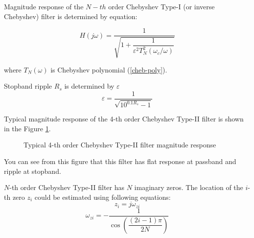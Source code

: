 Magnitude response of the $N-th$ order Chebyshev Type-I (or inverse Chebyshev)
filter is determined by equation:

\begin{equation}
 H(j\omega) = \frac{1}{\sqrt{1+\dfrac{1}{\varepsilon^2
T^2_N(\omega_c/\omega)}}}
\end{equation}

where $T_N(\omega)$ is Chebyshev polynomial (\ref{cheb-poly}).

Stopband ripple $R_s$ is determined by $\varepsilon$
\begin{equation}
 \varepsilon = \frac{1}{\sqrt{10^{0.1R_s}-1}}
\end{equation}

Typical magnitude response of the 4-th order Chebyshev Type-II filter is shown
in the Figure \ref{fig:cheb2}.

\begin{figure}[!ht]
  \centering
  \caption{Typical 4-th order Chebyshev Type-II filter magnitude response}
  \label{fig:cheb2}
\end{figure}

You can see from this figure that this filter has flat response at passband and
ripple at stopband.

$N$-th order Chebyshev Type-II filter has $N$ imaginary zeros. The location of
the $i$-th zero $z_i$ could be estimated using following equations:
\begin{equation}
 z_i = j\omega_{zi}
\end{equation}
\begin{equation}
 \omega_{zi} = -\frac{1}{\cos\left(\dfrac{(2i-1)\pi}{2N}\right)}
\end{equation}

